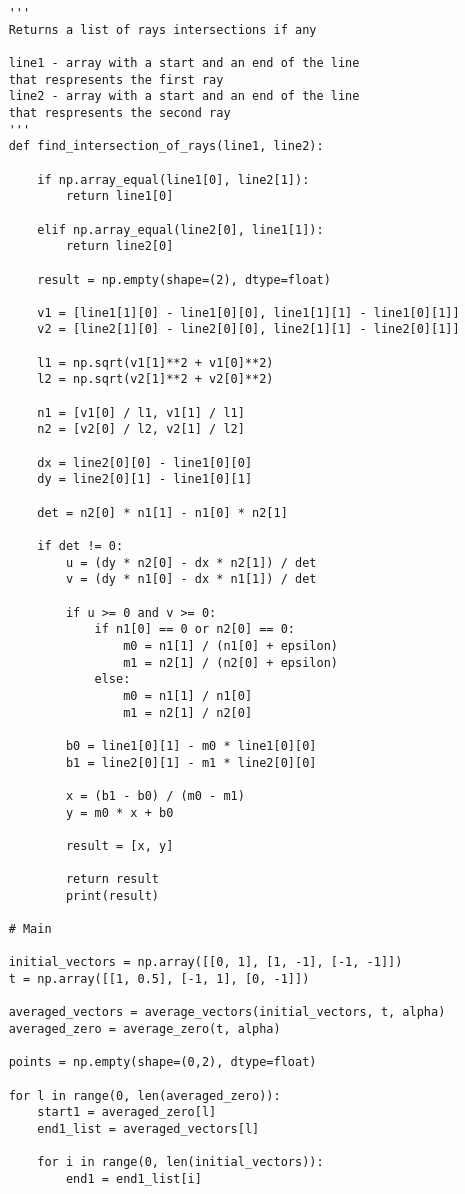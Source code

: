 \documentclass[12pt]{article}
\begin{document}
\begin{verbatim}
	'''
	Returns a list of rays intersections if any
	
	line1 - array with a start and an end of the line
	that respresents the first ray
	line2 - array with a start and an end of the line
	that respresents the second ray
	'''
	def find_intersection_of_rays(line1, line2):
	
		if np.array_equal(line1[0], line2[1]):
			return line1[0]
		
		elif np.array_equal(line2[0], line1[1]):
			return line2[0]
		
		result = np.empty(shape=(2), dtype=float)
		
		v1 = [line1[1][0] - line1[0][0], line1[1][1] - line1[0][1]]
		v2 = [line2[1][0] - line2[0][0], line2[1][1] - line2[0][1]]
		
		l1 = np.sqrt(v1[1]**2 + v1[0]**2)
		l2 = np.sqrt(v2[1]**2 + v2[0]**2)
		
		n1 = [v1[0] / l1, v1[1] / l1]
		n2 = [v2[0] / l2, v2[1] / l2]
		
		dx = line2[0][0] - line1[0][0]
		dy = line2[0][1] - line1[0][1]
		
		det = n2[0] * n1[1] - n1[0] * n2[1]
		
		if det != 0:
			u = (dy * n2[0] - dx * n2[1]) / det
			v = (dy * n1[0] - dx * n1[1]) / det
		
			if u >= 0 and v >= 0:
				if n1[0] == 0 or n2[0] == 0:
					m0 = n1[1] / (n1[0] + epsilon)
					m1 = n2[1] / (n2[0] + epsilon)
				else:
					m0 = n1[1] / n1[0]
					m1 = n2[1] / n2[0]
			
			b0 = line1[0][1] - m0 * line1[0][0]
			b1 = line2[0][1] - m1 * line2[0][0]
			
			x = (b1 - b0) / (m0 - m1)
			y = m0 * x + b0
			
			result = [x, y]
			
			return result
			print(result)
		
	# Main
	
	initial_vectors = np.array([[0, 1], [1, -1], [-1, -1]])
	t = np.array([[1, 0.5], [-1, 1], [0, -1]])
	
	averaged_vectors = average_vectors(initial_vectors, t, alpha)
	averaged_zero = average_zero(t, alpha)
	
	points = np.empty(shape=(0,2), dtype=float)
	
	for l in range(0, len(averaged_zero)):
		start1 = averaged_zero[l]
		end1_list = averaged_vectors[l]
		
		for i in range(0, len(initial_vectors)):
			end1 = end1_list[i]
			

\end{verbatim}
\end{document}
